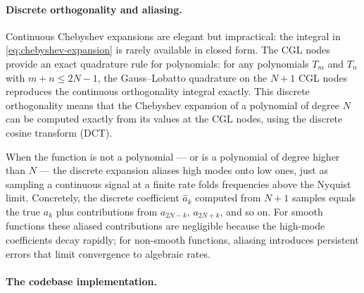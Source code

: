 \paragraph{Discrete orthogonality and aliasing.}

Continuous Chebyshev expansions are elegant but impractical: the
integral in \cref{eq:chebyshev-expansion} is rarely available in
closed form.  The CGL nodes provide an exact quadrature rule for
polynomials: for any polynomials $T_m$ and $T_n$ with
$m + n \leq 2N - 1$, the Gauss--Lobatto quadrature on the $N + 1$
CGL nodes reproduces the continuous orthogonality integral exactly.
This discrete orthogonality means that the Chebyshev expansion of a
polynomial of degree $N$ can be computed exactly from its values at
the CGL nodes, using the discrete cosine transform (DCT).

When the function is not a polynomial --- or is a polynomial of degree
higher than $N$ --- the discrete expansion aliases high modes onto low
ones, just as sampling a continuous signal at a finite rate folds
frequencies above the Nyquist limit.  Concretely, the discrete
coefficient $\hat{a}_k$ computed from $N + 1$ samples equals the true
$a_k$ plus contributions from $a_{2N-k}$, $a_{2N+k}$, and so on.
For smooth functions these aliased contributions are negligible
because the high-mode coefficients decay rapidly; for non-smooth
functions, aliasing introduces persistent errors that limit
convergence to algebraic rates.

\paragraph{The codebase implementation.}

